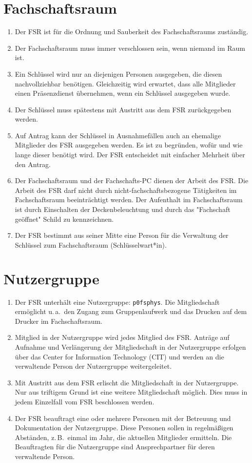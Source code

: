 \section{Fachschaftsraum}
\begin{enumerate}
	\item Der FSR ist für die Ordnung und Sauberkeit des Fachschaftsraums zuständig.
	\item Der Fachschaftsraum muss immer verschlossen sein, wenn niemand im Raum ist.
	\item Ein Schlüssel wird nur an diejenigen Personen ausgegeben, die diesen nachvollziehbar benötigen.
	Gleichzeitig wird erwartet, dass alle Mitglieder einen Präsenzdienst übernehmen, wenn ein Schlüssel ausgegeben wurde.
	\item Der Schlüssel muss spätestens mit Austritt aus dem FSR zurückgegeben werden.
	\item Auf Antrag kann der Schlüssel in Ausnahmefällen auch an ehemalige Mitglieder des FSR ausgegeben werden.
	Es ist zu begründen, wofür und wie lange dieser benötigt wird.
	Der FSR entscheidet mit einfacher Mehrheit über den Antrag.
	\item Der Fachschaftsraum und der Fachschafts-PC dienen der Arbeit des FSR. Die Arbeit des FSR darf nicht durch nicht-fachschaftsbezogene Tätigkeiten im Fachschaftsraum beeinträchtigt werden. Der Aufenthalt im Fachschaftsraum ist durch Einschalten der Deckenbeleuchtung und durch das "Fachschaft geöffnet" Schild zu kennzeichnen.
	\item Der FSR bestimmt aus seiner Mitte eine Person für die Verwaltung der Schlüssel zum Fachschaftsraum (Schlüsselwart*in).
\end{enumerate}

\section{Nutzergruppe}
\begin{enumerate}
	\item Der FSR unterhält eine Nutzergruppe: \texttt{p0fsphys}.
	Die Mitgliedschaft ermöglicht u.\,a.\ den Zugang zum Gruppenlaufwerk und das Drucken auf dem Drucker im Fachschaftsraum.
	\item Mitglied in der Nutzergruppe wird jedes Mitglied des FSR.
	Anträge auf Aufnahme und Verlängerung der Mitgliedschaft in der Nutzergruppe erfolgen über das Center for Information Technology (CIT) und werden an die verwaltende Person der Nutzergruppe weitergeleitet.
	\item Mit Austritt aus dem FSR erlischt die Mitgliedschaft in der Nutzergruppe.
	Nur aus triftigem Grund ist eine weitere Mitgliedschaft möglich.
	Dies muss in jedem Einzelfall vom FSR beschlossen werden.
	\item Der FSR beauftragt eine oder mehrere Personen mit der Betreuung und Dokumentation der Nutzergruppe.
	Diese Personen sollen in regelmäßigen Abständen, z.\,B.\ einmal im Jahr, die aktuellen Mitglieder ermitteln.
	Die Beauftragten für die Nutzergruppe sind Ansprechpartner für deren verwaltende Person.
\end{enumerate}

